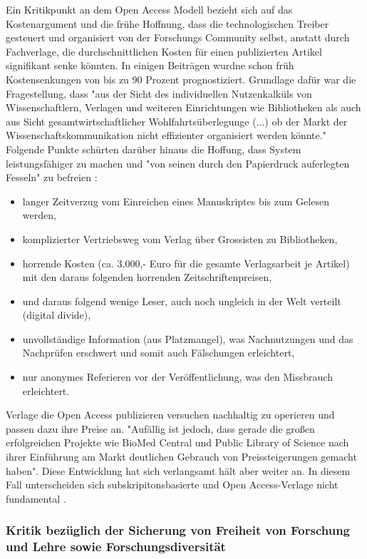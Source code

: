 Ein Kritikpunkt an dem Open Access Modell bezieht sich auf das Kostenargument und die frühe Hoffnung, dass die technologischen Treiber gesteuert und organisiert von der Forschungs Community selbst, anstatt durch Fachverlage, die durchschnittlichen Kosten für einen publizierten Artikel signifikant senke könnten. In einigen Beiträgen wurdne schon früh Kostensenkungen von bis zu 90 Prozent\cite{hilf_2004} prognostiziert. Grundlage dafür war die Fragestellung, dass "aus der Sicht des individuellen Nutzenkalküls von Wissenschaftlern, Verlagen und weiteren Einrichtungen wie Bibliotheken als auch aus Sicht gesamtwirtschaftlicher Wohlfahrtsüberlegunge (...) ob der Markt der Wissenschaftskommunikation nicht effizienter organisiert werden könnte."\cite{Hess_2006} Folgende Punkte schürten darüber hinaus die Hoffung, dass System leistungsfähiger zu machen und "von seinen durch den Papierdruck auferlegten Fesseln" zu befreien \cite{hilf_2004}:
\begin{itemize}
\item langer Zeitverzug vom Einreichen eines Manuskriptes bis zum Gelesen werden,
\item komplizierter Vertriebsweg vom Verlag über Grossisten zu Bibliotheken,
\item horrende Kosten (ca. 3.000,- Euro für die gesamte Verlagsarbeit je Artikel) mit den daraus folgenden horrenden Zeitschriftenpreisen,
\item und daraus folgend wenige Leser, auch noch ungleich in der Welt verteilt (digital divide),
\item unvollständige Information (aus Platzmangel), was Nachnutzungen und das Nachprüfen erschwert und somit auch Fälschungen erleichtert,
\item nur anonymes Referieren vor der Veröffentlichung, was den Missbrauch erleichtert. 
\end{itemize}

Verlage die Open Access publizieren versuchen nachhaltig zu operieren und passen dazu ihre Preise an. "Aufällig ist jedoch, dass gerade die großen erfolgreichen Projekte wie BioMed Central und Public Library of Science nach ihrer Einführung am Markt deutlichen Gebrauch von Preissteigerungen gemacht haben"\cite{schmidt_2007_goldenen}. Diese Entwicklung hat sich verlangsamt hält aber weiter an\cite{suchen}. In diesem Fall unterscheiden sich subskripitonsbasierte und Open Access-Verlage nicht fundamental \cite{schmidt_2007_goldenen}.

\subsubsection{Kritik bezüglich der Sicherung von Freiheit von Forschung und Lehre sowie Forschungsdiversität}

